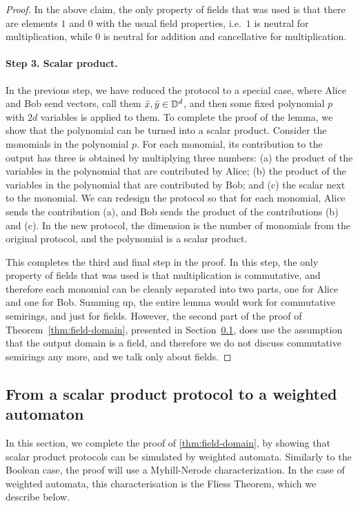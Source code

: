 \begin{proof}
 In the above claim, the only property of fields that was used is that there are elements $1$ and $0$ with the usual field properties, i.e.~$1$ is neutral for multiplication, while $0$ is neutral for addition and cancellative for multiplication.

 \paragraph*{Step 3. Scalar product.} In the previous step, we have reduced the protocol to a special case, where Alice and Bob send vectors, call them $\bar x, \bar y \in \mathbb D^d$, and then some fixed polynomial $p$ with $2d$ variables is applied to them. 
  To complete the proof of the lemma, we show that the polynomial can be turned into a scalar product. Consider the monomials in the polynomial $p$. For each monomial, its contribution to the output has three is obtained by multiplying three numbers: (a) the product of the  variables in the polynomial that are contributed by Alice;  (b) the product of the variables in the polynomial that are contributed by Bob; and (c)  the scalar next to the monomial. We can redesign the protocol so that for each monomial, Alice sends the contribution (a), and Bob sends the product of the contributions (b) and (c). In the new protocol, the dimension is the number of monomials from the original protocol, and the polynomial is a scalar product. 

  This completes the third and final step in the proof. In this step, the only property of fields that was used is that multiplication is commutative, and therefore each monomial can be cleanly separated into two parts, one for Alice and one for Bob. Summing up, the entire lemma would work for commutative semirings, and just for fields. However, the second part of the proof of Theorem~\ref{thm:field-domain}, presented in Section~\ref{sec:from-scalar-product-protocol-to-weighted-automaton}, does use the assumption  that the output domain is a field, and therefore we do not discuss commutative semirings any more, and we talk only about fields.
\end{proof}

\subsection{From a scalar product protocol to a weighted automaton}
\label{sec:from-scalar-product-protocol-to-weighted-automaton}
In this section, we complete the proof of \cref{thm:field-domain}, by showing that scalar product protocols can be simulated by weighted automata. Similarly to the Boolean case, the proof will use a Myhill-Nerode characterization. In the case of weighted automata, this characterisation is the Fliess Theorem, which we describe below.


